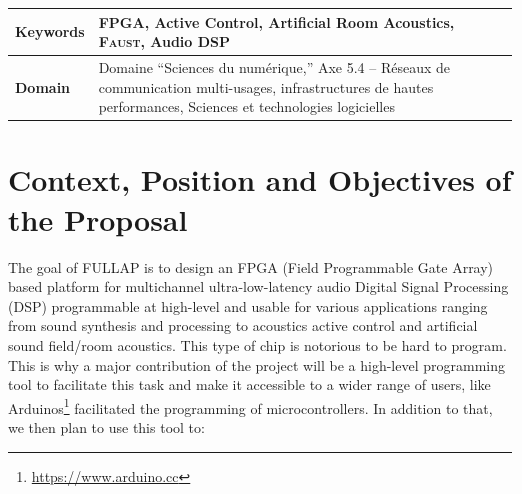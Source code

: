 \documentclass[a4paper,10pt]{article}
\author{Coordinator: Romain Michon\\
\small GRAME-CNCM, Lyon.
}
\title{\vspace{-\baselineskip}\mytitle}
\date{Domaine ``Sciences du numérique''\\
Axe 5.4 -- Réseaux de communication multi-usages, infrastructures de hautes performances, Sciences et technologies logicielles}
\newcommand{\F}{\textsc{Faust}}
\newcommand{\PP}{FULLAP}
\begin{document}
\maketitle
\thispagestyle{fancy}



\begin{tabular}{p{2.3cm} p{12.5cm}}
  \hline
  \textbf{Keywords} & FPGA, Active Control, Artificial Room Acoustics, \F{}, Audio DSP \\\hline
  \textbf{Domain} & Domaine ``Sciences du numérique,'' Axe 5.4 -- Réseaux de communication multi-usages, infrastructures de hautes performances, Sciences et technologies logicielles \\\hline
\end{tabular}

\section*{Context, Position and Objectives of the Proposal}


The goal of \PP{} is to design an FPGA (Field Programmable Gate Array) based platform for multichannel ultra-low-latency audio Digital Signal Processing (DSP) programmable at high-level and usable for various applications ranging from sound synthesis and processing to acoustics active control and artificial sound field/room acoustics.  This type of chip is notorious to be hard to program. This is why a major contribution of the project will be a high-level programming tool to facilitate this task and make it accessible to a wider range of users, like Arduinos\footnote{\url{https://www.arduino.cc}} facilitated the programming of microcontrollers. In addition to that, we then plan to use this tool to: 
\end{document}
